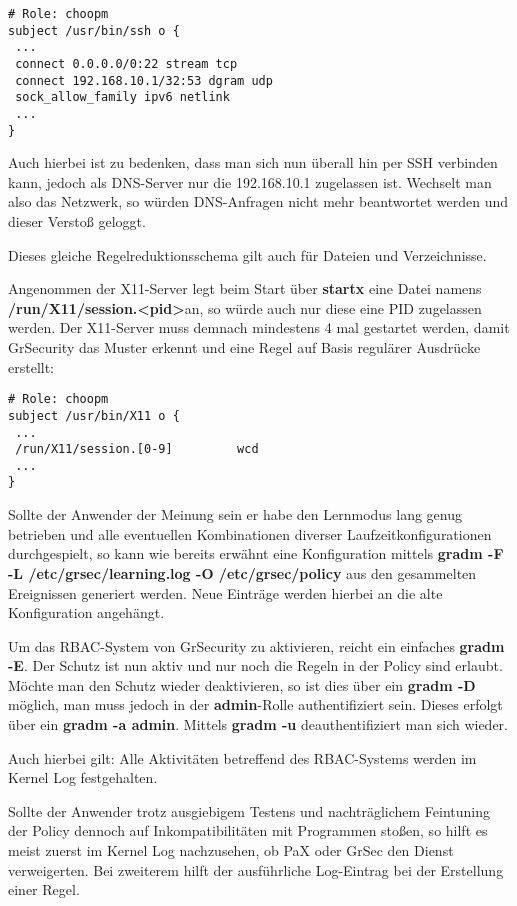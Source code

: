 \begin{lstlisting}[numbers=none, frame=single, lineskip={-2.5pt}, breaklines=true]
# Role: choopm
subject /usr/bin/ssh o {
 ...
 connect 0.0.0.0/0:22 stream tcp
 connect 192.168.10.1/32:53 dgram udp
 sock_allow_family ipv6 netlink
 ...
}
\end{lstlisting}

Auch hierbei ist zu bedenken, dass man sich nun überall hin per SSH verbinden kann, jedoch als DNS-Server nur die 192.168.10.1 zugelassen ist. Wechselt man also das Netzwerk, so würden DNS-Anfragen nicht mehr beantwortet werden und dieser Verstoß geloggt.

Dieses gleiche Regelreduktionsschema gilt auch für Dateien und Verzeichnisse.

Angenommen der X11-Server legt beim Start über \textbf{startx} eine Datei namens \textbf{/run/X11/session.\textless pid\textgreater}an, so würde auch nur diese eine PID zugelassen werden. Der X11-Server muss demnach mindestens 4 mal gestartet werden, damit GrSecurity das Muster erkennt und eine Regel auf Basis regulärer Ausdrücke erstellt:
\begin{lstlisting}[numbers=none, frame=single, lineskip={-2.5pt}, breaklines=true]
# Role: choopm
subject /usr/bin/X11 o {
 ...
 /run/X11/session.[0-9]			wcd
 ...
}
\end{lstlisting}

Sollte der Anwender der Meinung sein er habe den Lernmodus lang genug betrieben und alle eventuellen Kombinationen diverser Laufzeitkonfigurationen durchgespielt, so kann wie bereits erwähnt eine Konfiguration mittels \textbf{gradm -F -L /etc/grsec/learning.log -O /etc/grsec/policy} aus den gesammelten Ereignissen generiert werden. Neue Einträge werden hierbei an die alte Konfiguration angehängt.

Um das RBAC-System von GrSecurity zu aktivieren, reicht ein einfaches \textbf{gradm -E}. Der Schutz ist nun aktiv und nur noch die Regeln in der Policy sind erlaubt. Möchte man den Schutz wieder deaktivieren, so ist dies über ein \textbf{gradm -D} möglich, man muss jedoch in der \textbf{admin}-Rolle authentifiziert sein. Dieses erfolgt über ein \textbf{gradm -a admin}. Mittels \textbf{gradm -u} deauthentifiziert man sich wieder.

Auch hierbei gilt: Alle Aktivitäten betreffend des RBAC-Systems werden im Kernel Log festgehalten.

Sollte der Anwender trotz ausgiebigem Testens und nachträglichem Feintuning der Policy dennoch auf Inkompatibilitäten mit Programmen stoßen, so hilft es meist zuerst im Kernel Log nachzusehen, ob PaX oder GrSec den Dienst verweigerten. Bei zweiterem hilft der ausführliche Log-Eintrag bei der Erstellung einer Regel.

